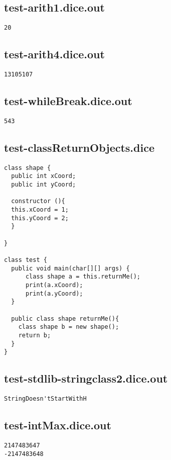 \subsection{test-arith1.dice.out}
\begin{verbatim}
20
\end{verbatim}
\pagebreak
\subsection{test-arith4.dice.out}
\begin{verbatim}
13105107
\end{verbatim}
\pagebreak
\subsection{test-whileBreak.dice.out}
\begin{verbatim}
543
\end{verbatim}
\pagebreak
\subsection{test-classReturnObjects.dice}
\begin{verbatim}
class shape {
  public int xCoord;
  public int yCoord;

  constructor (){
  this.xCoord = 1;
  this.yCoord = 2;
  }

}

class test {
  public void main(char[][] args) {
      class shape a = this.returnMe();
      print(a.xCoord);
      print(a.yCoord);
  }

  public class shape returnMe(){
    class shape b = new shape();
    return b;
  }
}
\end{verbatim}
\pagebreak
\subsection{test-stdlib-stringclass2.dice.out}
\begin{verbatim}
StringDoesn'tStartWithH
\end{verbatim}
\pagebreak
\subsection{test-intMax.dice.out}
\begin{verbatim}
2147483647
-2147483648
\end{verbatim}
\pagebreak
